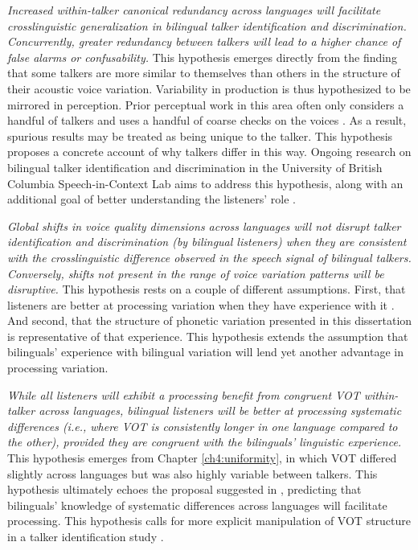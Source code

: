 \textit{Increased within-talker canonical redundancy across languages will facilitate crosslinguistic generalization in bilingual talker identification and discrimination. Concurrently, greater redundancy between talkers will lead to a higher chance of false alarms or confusability.} This hypothesis emerges directly from the finding that some talkers are more similar to themselves than others in the structure of their acoustic voice variation. Variability in production is thus hypothesized to be mirrored in perception. Prior perceptual work in this area often only considers a handful of talkers and uses a handful of coarse checks on the voices \citep{lavan_2019_flexible}. As a result, spurious results may be treated as being unique to the talker. This hypothesis proposes a concrete account of why talkers differ in this way. Ongoing research on bilingual talker identification and discrimination in the University of British Columbia Speech-in-Context Lab aims to address this hypothesis, along with an additional goal of better understanding the listeners' role \citep{lloy_2020_bilingual, lloy_2021_examining}.

\textit{Global shifts in voice quality dimensions across languages will not disrupt talker identification and discrimination (by bilingual listeners) when they are consistent with the crosslinguistic difference observed in the speech signal of bilingual talkers. Conversely, shifts not present in the range of voice variation patterns will be disruptive.} This hypothesis rests on a couple of different assumptions. First, that listeners are better at processing variation when they have experience with it \citep[e.g., see arguments in:][]{fricke_2016_phonetic, orena_2019_identifying}. And second, that the structure of phonetic variation presented in this dissertation is representative of that experience. This hypothesis extends the assumption that bilinguals' experience with bilingual variation will lend yet another advantage in processing variation. 

\textit{While all listeners will exhibit a processing benefit from congruent VOT within-talker across languages, bilingual listeners will be better at processing systematic differences (i.e., where VOT is consistently longer in one language compared to the other), provided they are congruent with the bilinguals' linguistic experience.} This hypothesis emerges from Chapter \ref{ch4:uniformity}, in which VOT differed slightly across languages but was also highly variable between talkers. This hypothesis ultimately echoes the proposal suggested in \citet{orena_2019_identifying}, predicting that bilinguals' knowledge of systematic differences across languages will facilitate processing. This hypothesis calls for more explicit manipulation of VOT structure in a talker identification study \citep[e.g., a bilingual adaptation of][]{ganugapati_2019_structured}.

